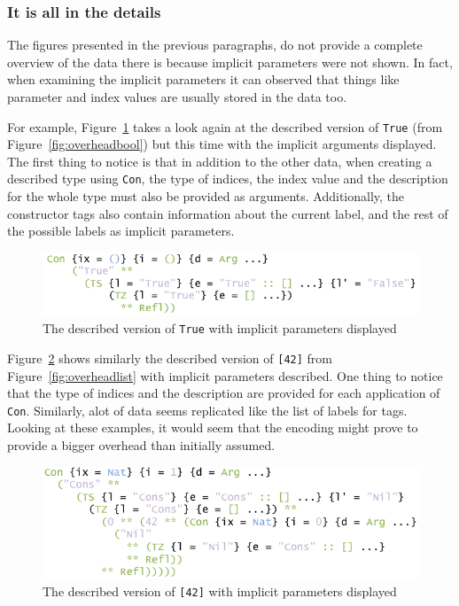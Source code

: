 \documentclass{ituthesis}
\newcommand{\ttconstructor}[1]{\textcolor{constructor-color}{\texttt{#1}}}
\newcommand{\ttliteral}[1]{\textcolor{literal-color}{\texttt{#1}}}
\theoremstyle{break}
\begin{document}
\subsubsection{It is all in the details}
\label{ssub:Itisallinthedetails}
The figures presented in the previous paragraphs, do not provide a complete overview of the data there is because implicit parameters were not shown.
In fact, when examining the implicit parameters it can observed that things like parameter and index values are usually stored in the data too.

For example, Figure~\ref{fig:overheadboolimpl} takes a look again at the described version of \ttconstructor{True} (from Figure~\ref{fig:overheadbool}) but this time with the implicit arguments displayed.
The first thing to notice is that in addition to the other data, when creating a described type using \ttconstructor{Con}, the type of indices, the index value and the description for the whole type must also be provided as arguments.
Additionally, the constructor tags also contain information about the current label, and the rest of the possible labels as implicit parameters.

\begin{figure}[ht]
\begin{center}
    \includegraphics[scale=0.5]{Figures/GenericsOverheadBoolImpl.png}
\end{center}
\caption{The described version of \ttconstructor{True} with implicit parameters displayed}
\label{fig:overheadboolimpl}
\end{figure}

Figure~\ref{fig:overheadlistimpl} shows similarly the described version of \ttconstructor{[}\ttliteral{42}\ttconstructor{]} from Figure~\ref{fig:overheadlist} with implicit parameters described.
One thing to notice that the type of indices and the description are provided for each application of \ttconstructor{Con}.
Similarly, alot of data seems replicated like the list of labels for tags.
Looking at these examples, it would seem that the encoding might prove to provide a bigger overhead than initially assumed.

\begin{figure}[ht]
\begin{center}
    \includegraphics[scale=0.5]{Figures/GenericsOverheadListImpl.png}
\end{center}
\caption{The described version of \ttconstructor{[}\ttliteral{42}\ttconstructor{]} with implicit parameters displayed}
\label{fig:overheadlistimpl}
\end{figure}
\end{document}
